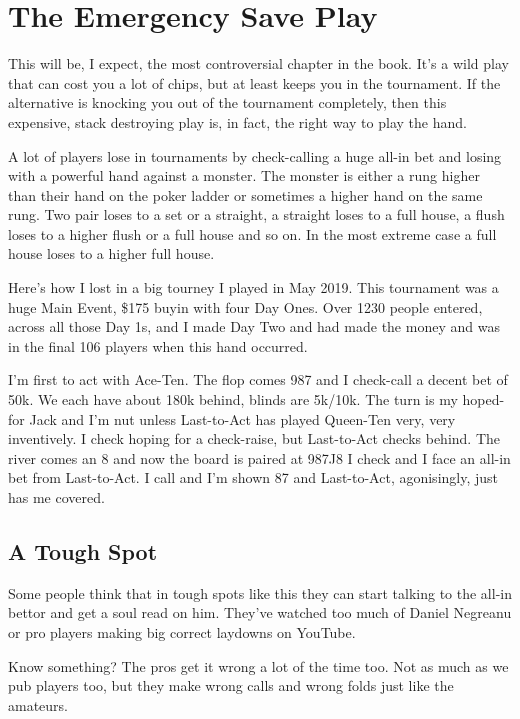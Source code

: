 \chapter{The Emergency Save Play}


This will be, I expect, the most controversial chapter in the
book. It's a wild play that can cost you a lot of chips, but at least
keeps you in the tournament. If the alternative is knocking you out of
the tournament completely, then this expensive, stack destroying play
is, in fact, the right way to play the hand.

A lot of players lose in tournaments by check-calling a huge all-in
bet and losing with a powerful hand against a monster. The monster is
either a rung higher than their hand on the poker ladder or sometimes
a higher hand on the same rung. Two pair loses to a set or a straight,
a straight loses to a full house, a flush loses to a higher flush or a
full house and so on. In the most extreme case a full house loses to a
higher full house.

Here's how I lost in a big tourney I played in May 2019. This
tournament was a huge Main Event, \$175 buyin with four Day Ones. Over
1230 people entered, across all those Day 1s, and I made Day Two and
had made the money and was in the final 106 players when this hand
occurred.

I'm first to act with Ace-Ten. The flop comes 987 and I check-call a
decent bet of 50k. We each have about 180k behind, blinds are 5k/10k.
The turn is my hoped-for Jack and I'm nut unless Last-to-Act has
played Queen-Ten very, very inventively. I check hoping for a
check-raise, but Last-to-Act checks behind. The river comes an 8 and
now the board is paired at 987J8 I check and I face an all-in bet from
Last-to-Act. I call and I'm shown 87 and Last-to-Act, agonisingly,
just has me covered.

\section{A Tough Spot}

Some people think that in tough spots like this they can start talking
to the all-in bettor and get a soul read on him. They've watched too
much of Daniel Negreanu or pro players making big correct laydowns on
YouTube.

Know something? The pros get it wrong a lot of the time too. Not as
much as we pub players too, but they make wrong calls and wrong folds
just like the amateurs.

